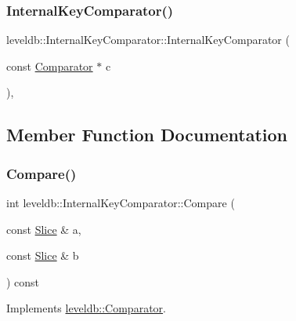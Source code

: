\subsubsection{\texorpdfstring{InternalKeyComparator()}{InternalKeyComparator()}}
{\footnotesize\ttfamily leveldb\+::\+Internal\+Key\+Comparator\+::\+Internal\+Key\+Comparator (\begin{DoxyParamCaption}\item[{const \mbox{\hyperlink{structleveldb_1_1_comparator}{Comparator}} $\ast$}]{c }\end{DoxyParamCaption})\hspace{0.3cm}{\ttfamily [inline]}, {\ttfamily [explicit]}}



\subsection{Member Function Documentation}
\mbox{\label{classleveldb_1_1_internal_key_comparator_a8ee088d285165f692f2f03ac5b3e13b1}} 
\subsubsection{\texorpdfstring{Compare()}{Compare()}\hspace{0.1cm}{\footnotesize\ttfamily [1/2]}}
{\footnotesize\ttfamily int leveldb\+::\+Internal\+Key\+Comparator\+::\+Compare (\begin{DoxyParamCaption}\item[{const \mbox{\hyperlink{classleveldb_1_1_slice}{Slice}} \&}]{a,  }\item[{const \mbox{\hyperlink{classleveldb_1_1_slice}{Slice}} \&}]{b }\end{DoxyParamCaption}) const\hspace{0.3cm}{\ttfamily [virtual]}}



Implements \mbox{\hyperlink{structleveldb_1_1_comparator_a05dae6edcad3c7db23827c0233d74039}{leveldb\+::\+Comparator}}.

